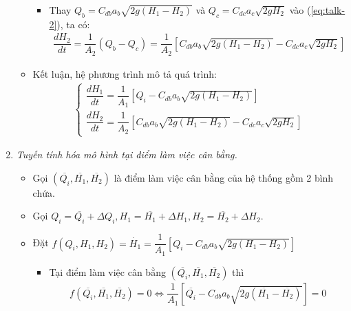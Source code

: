 \documentclass[12pt,a4paper]{article}
\begin{document}
\begin{enumerate}[\it a.]
\begin{itemize}
\begin{itemize}
                            \item Thay $Q_b = C_{db}a_b\sqrt{2g(H_1 - H_2)}$ và $Q_c = C_{dc}a_c\sqrt{2gH_2}$ vào (\ref{eq:talk-2}), ta có:
                                \begin{align} \label{eq:talk-2-2}
                                    \dfrac{dH_2}{dt} = \dfrac{1}{A_2} \left({Q_b - Q_c}\right) = \dfrac{1}{A_2} \left[{C_{db}a_b\sqrt{2g(H_1 - H_2)} - C_{dc}a_c\sqrt{2gH_2}}\right]
                                \end{align}
                        \end{itemize}

                    \item Kết luận, hệ phương trình mô tả quá trình:
                        \begin{align}
                            \left\{
                            \begin{array}{l}
                                \dfrac{dH_1}{dt} = \dfrac{1}{A_1} \left[{Q_i - C_{db}a_b\sqrt{2g(H_1 - H_2)}}\right]\\ [.5cm]
                                \dfrac{dH_2}{dt} = \dfrac{1}{A_2} \left[{C_{db}a_b\sqrt{2g(H_1 - H_2)} - C_{dc}a_c\sqrt{2gH_2}}\right]
                            \end{array}
                            \right.
                        \end{align}
                \end{itemize}

            \item \textit{Tuyến tính hóa mô hình tại điểm làm việc cân bằng.}
                \begin{itemize}
                    \item Gọi $\left({ \overline{Q_i}, \overline{H_1}, \overline{H_2}}\right)$ là điểm làm việc cân bằng của hệ thống gồm 2 bình chứa.

                    \item Gọi $Q_i = \overline{Q_i} + \Delta Q_i, H_1 = \overline{H_1} + \Delta H_1, H_2 = \overline{H_2} + \Delta H_2$.

                    \item Đặt $f\left({Q_i, H_1, H_2}\right) = \dot{H_1} = \dfrac{1}{A_1} \left[{Q_i - C_{db}a_b\sqrt{2g(H_1 - H_2)}}\right]$
                        \begin{itemize}
                            \item Tại điểm làm việc cân bằng $\left({ \overline{Q_i}, \overline{H_1}, \overline{H_2}}\right)$ thì
                                \begin{align}
                                    f\left({ \overline{Q_i}, \overline{H_1}, \overline{H_2}}\right) = 0 \Longleftrightarrow \dfrac{1}{A_1} \left[{\overline{Q_i} - C_{db}a_b\sqrt{2g(\overline{H_1} - \overline{H_2})}}\right] = 0
                                \end{align}


\end{itemize}
\end{itemize}
\end{enumerate}
\end{document}

